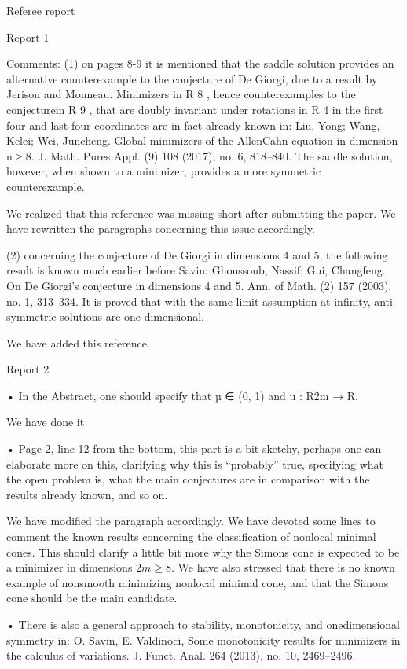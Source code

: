 Referee report


Report 1

Comments:
(1) on pages 8-9 it is mentioned that the saddle solution provides an alternative counterexample to the conjecture of De Giorgi, due to a result by Jerison and Monneau. Minimizers in R 8
, hence counterexamples to the conjecturein R 9
, that are doubly invariant under rotations in R 4 in the first four and
last four coordinates are in fact already known in:
Liu, Yong; Wang, Kelei; Wei, Juncheng. Global minimizers of the AllenCahn equation in dimension n ≥ 8. J. Math. Pures Appl. (9) 108 (2017),
no. 6, 818–840.
The saddle solution, however, when shown to a minimizer, provides a
more symmetric counterexample.


We realized that this reference was missing short after submitting the paper. We have rewritten the paragraphs concerning this issue accordingly.


(2) concerning the conjecture of De Giorgi in dimensions 4 and 5, the following
result is known much earlier before Savin:
Ghoussoub, Nassif; Gui, Changfeng. On De Giorgi’s conjecture in dimensions 4 and 5. Ann. of Math. (2) 157 (2003), no. 1, 313–334.
It is proved that with the same limit assumption at infinity, anti-symmetric
solutions are one-dimensional.


We have added this reference.




Report 2


• In the Abstract, one should specify that µ ∈ (0, 1) and u : R2m → R.

We have done it

• Page 2, line 12 from the bottom, this part is a bit sketchy, perhaps one can elaborate more on this, clarifying why this is “probably” true, specifying what the open problem is, what the main conjectures are in comparison with the results already known, and so on.

We have modified the paragraph accordingly. We have devoted some lines to comment the known results concerning the classification of nonlocal minimal cones. This should clarify a little bit more why the Simons cone is expected to be a minimizer in dimensions $2m\geq8$. We have also stressed that there is no known example of nonsmooth minimizing nonlocal minimal cone, and that the Simons cone should be the main candidate.

• There is also a general approach to stability, monotonicity, and onedimensional symmetry in: O. Savin, E. Valdinoci, Some monotonicity results for minimizers in the calculus of variations. J. Funct. Anal. 264 (2013), no. 10, 2469–2496.

